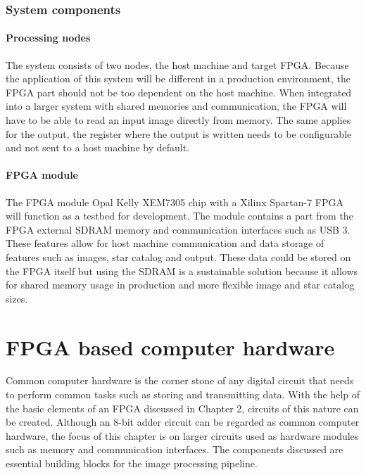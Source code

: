 \documentclass[12pt]{report}
\begin{document}
\subsection{System components}
\subsubsection{Processing nodes}
The system consists of two nodes, the host machine and target FPGA. Because the application of this system will be different in a production environment, the FPGA part should not be too dependent on the host machine. When integrated into a larger system with shared memories and communication, the FPGA will have to be able to read an input image directly from memory. The same applies for the output, the register where the output is written needs to be configurable and not sent to a host machine by default.

\subsubsection{FPGA module}
The FPGA module Opal Kelly XEM7305 chip with a Xilinx Spartan-7 FPGA will function as a testbed for development. The module contains a part from the FPGA external SDRAM memory and communication interfaces such as USB 3. These features allow for host machine communication and data storage of features such as images, star catalog and output. These data could be stored on the FPGA itself but using the SDRAM is a sustainable solution because it allows for shared memory usage in production and more flexible image and star catalog sizes.


\chapter{FPGA based computer hardware}
Common computer hardware is the corner stone of any digital circuit that needs to perform common tasks such as storing and transmitting data. With the help of the basic elements of an FPGA discussed in Chapter 2, circuits of this nature can be created. Although an 8-bit adder circuit can be regarded as common computer hardware, the focus of this chapter is on larger circuits used as hardware modules such as memory and communication interfaces. The components discussed are essential building blocks for the image processing pipeline.
\end{document}
